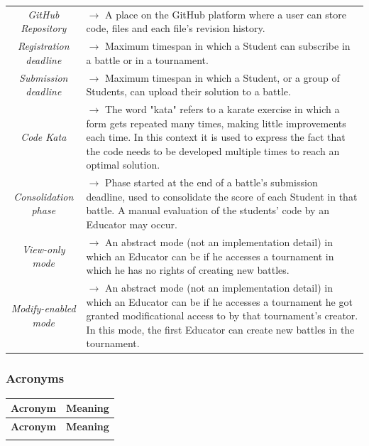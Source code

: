 \documentclass{article}
\begin{document}
{\begin{xltabular}{\textwidth}{ >{\raggedright\arraybackslash}c >{\raggedright\arraybackslash}X }
    \textit{GitHub Repository} & $\rightarrow$ A place on the GitHub platform where a user can store code, files and each file's revision history. \\
    \textit{Registration deadline} & $\rightarrow$ Maximum timespan in which a Student can subscribe in a battle or in a tournament. \\
    \textit{Submission deadline} & $\rightarrow$ Maximum timespan in which a Student, or a group of Students, can upload their solution to a battle. \\
    \textit{Code Kata} & $\rightarrow$ The word "kata" refers to a karate exercise in which a form gets repeated many times, 
    making little improvements each time.
    In this context it is used to express the fact that the code needs to be developed multiple times to reach an optimal solution. \\
    \textit{Consolidation phase} & $\rightarrow$ Phase started at the end of a battle's submission deadline, used to consolidate the score of each Student 
    in that battle. A manual evaluation of the students' code by an Educator may occur. \\
    \textit{View-only mode} & $\rightarrow$ An abstract mode (not an implementation detail) in which an Educator can be if he accesses
     a tournament in which he has no rights of creating new battles. \\
    \textit{Modify-enabled mode }& $\rightarrow$ An abstract mode (not an implementation detail) in which an Educator can be if
     he accesses a tournament he got granted modificational access to by that tournament's creator. 
     In this mode, the first Educator can create new battles in the tournament.
\end{xltabular}

\subsubsection{Acronyms}
\begin{xltabular}{\textwidth}{ >{\raggedright\arraybackslash}c >{\raggedright\arraybackslash}X }
    \hline
    \textbf{Acronym} & \textbf{Meaning} \\
    \hline

    \endfirsthead

    \hline
    \textbf{Acronym} & \textbf{Meaning} \\
    \hline

    \endhead
    \endfoot
    \endlastfoot


\end{xltabular}}
\end{document}
